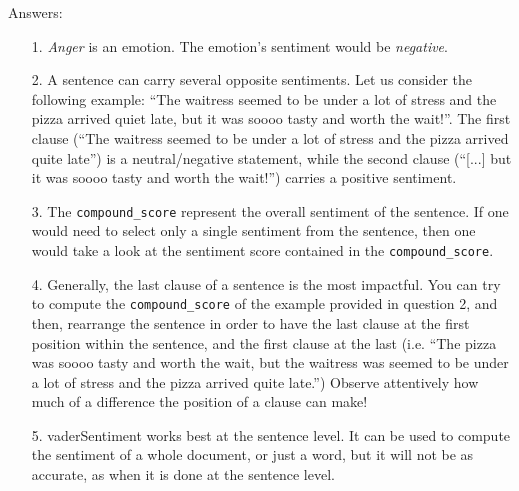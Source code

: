 		Answers:
	\begin{itemize}
		\item [1.] \textit{Anger} is an emotion. The emotion's sentiment would be \textit{negative}.
		\item [2.] A sentence can carry several opposite sentiments. Let us consider the following example: ``The waitress seemed to be under a lot of stress and the pizza arrived quiet late, but it was soooo tasty and worth the wait!''. The first clause (``The waitress seemed to be under a lot of stress and the pizza arrived quite late'') is a neutral/negative statement, while the second clause (``[...] but it was soooo tasty and worth the wait!'') carries a positive sentiment.
		\item [3.] The \verb|compound_score| represent the overall sentiment of the sentence. If one would need to select only a single sentiment from the sentence, then one would take a look at the sentiment score contained in the \verb|compound_score|.
		\item [4.] Generally, the last clause of a sentence is the most impactful. You can try to compute the \verb|compound_score| of the example provided in question 2, and then, rearrange the sentence in order to have the last clause at the first position within the sentence, and the first clause at the last (i.e. ``The pizza was soooo tasty and worth the wait, but the waitress was seemed to be under a lot of stress and the pizza arrived quite late.'') Observe attentively how much of a difference the position of a clause can make!
		\item [5.] vaderSentiment works best at the sentence level. It can be used to compute the sentiment of a whole document, or just a word, but it will not be as accurate, as when it is done at the sentence level.
	\end{itemize}
	
